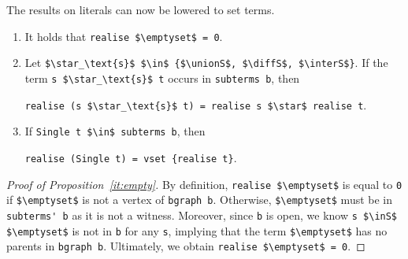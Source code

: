 \documentclass[
  sigplan,
  10pt,
  ]{acmart}
\newcommand{\unionS}{\sqcup_\text{s}}
\newcommand{\interS}{\sqcap_\text{s}}
\newcommand{\diffS}{-_\text{s}}
\newcommand{\inS}{\in_\text{s}}
\begin{document}
\noindent The results on literals can now be lowered to set terms.
\begin{enumerate}[label=(\alph*)]
  \item\label{it:empty} It holds that \lstinline!realise $\emptyset$ = 0!.
  \item\label{it:op} Let \lstinline!$\star_\text{s}$ $\in$ {$\unionS$, $\diffS$, $\interS$}!. If the term \lstinline!s $\star_\text{s}$ t! occurs in \lstinline!subterms b!, then
    \begin{center}
    \lstinline!realise (s $\star_\text{s}$ t) = realise s $\star$ realise t!.
    \end{center}
  \item\label{it:single} If \lstinline!Single t $\in$ subterms b!, then
    \begin{center}
    \lstinline!realise (Single t) = vset {realise t}!.
    \end{center}
\end{enumerate}
\begin{proof}[Proof of Proposition~\ref{it:empty}]
  By definition, \lstinline!realise $\emptyset$! is equal to \lstinline!0! if \lstinline!$\emptyset$! is not a vertex of \lstinline!bgraph b!.
  Otherwise, \lstinline!$\emptyset$! must be in \lstinline!subterms' b! as it is not a witness.
  Moreover, since \lstinline!b! is open, we know \lstinline!s $\inS$ $\emptyset$! is not in \lstinline!b! for any \lstinline!s!, implying that the term \lstinline!$\emptyset$! has no parents in \lstinline!bgraph b!.
  Ultimately, we obtain \lstinline!realise $\emptyset$ = 0!.
\end{proof}
\end{document}

